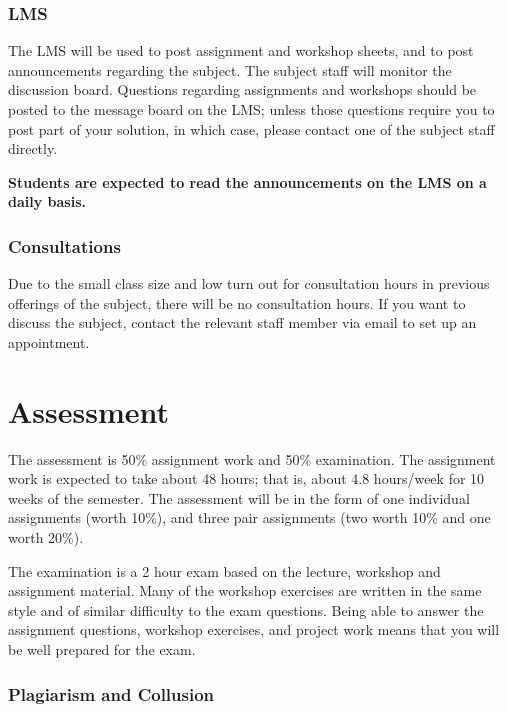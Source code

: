 \documentclass{article}
\begin{document}
\subsubsection*{LMS}

The LMS will be used to post assignment and workshop sheets, and to
post announcements regarding the subject.  The subject staff will
monitor the discussion board. Questions regarding assignments and
workshops should be posted to the message board on the LMS; unless
those questions require you to post part of your solution, in which
case, please contact one of the subject staff directly.

\begin{center}
{\bf Students are expected to read the announcements on the LMS on a
  daily basis.}  
\end{center}

\subsubsection*{Consultations}

Due to the small class size and low turn out for consultation hours in previous offerings of the subject, there will be no consultation hours. If you want to discuss the subject, contact the relevant staff member via email to set up an appointment.

\section*{Assessment}

The assessment is 50\%
assignment work and 50\% examination. The assignment
work is expected to take about 48 hours; that is, about 4.8 hours/week
for 10 weeks of the semester. The assessment will be in the form of
one individual assignments (worth 10\%), and three pair assignments (two worth 10\% and one worth 20\%).

The examination is a 2 hour exam based on the lecture, workshop and
assignment material. Many of the workshop exercises are written in the same
style and of similar difficulty to the exam questions. Being able to
answer the assignment questions, workshop exercises, and project work
means that you will be well prepared for the exam.

\subsubsection*{Plagiarism and Collusion}
\end{document}
